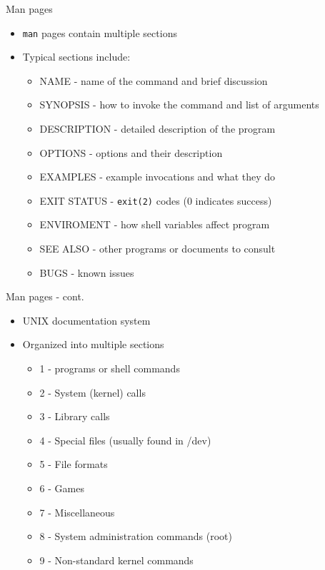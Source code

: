 \documentclass[t]{beamer}
\begin{document}
\begin{frame}{Man pages}
  \begin{itemize}
  \item \texttt{man} pages contain multiple sections
  \item Typical sections include:
    \begin{itemize}
    \item NAME - name of the command and brief discussion
    \item SYNOPSIS - how to invoke the command and list of arguments
    \item DESCRIPTION - detailed description of the program
    \item OPTIONS - options and their description
    \item EXAMPLES - example invocations and what they do
    \item EXIT STATUS - \texttt{exit(2)} codes (0 indicates success) 
    \item ENVIROMENT - how shell variables affect program
    \item SEE ALSO - other programs or documents to consult
    \item BUGS - known issues
    \end{itemize}
  \end{itemize}
  \note{}
\end{frame}

\begin{frame}{Man pages - cont.}
  \begin{itemize}
  \item UNIX documentation system
  \item Organized into multiple sections
    \begin{itemize}
    \item 1 - programs or shell commands
    \item 2 - System (kernel) calls
    \item 3 - Library calls
    \item 4 - Special files (usually found in /dev)
    \item 5 - File formats
    \item 6 - Games
    \item 7 - Miscellaneous
    \item 8 - System administration commands (root)
    \item 9 - Non-standard kernel commands
    \end{itemize}
  \end{itemize}
  \note{}
\end{frame}
\end{document}
